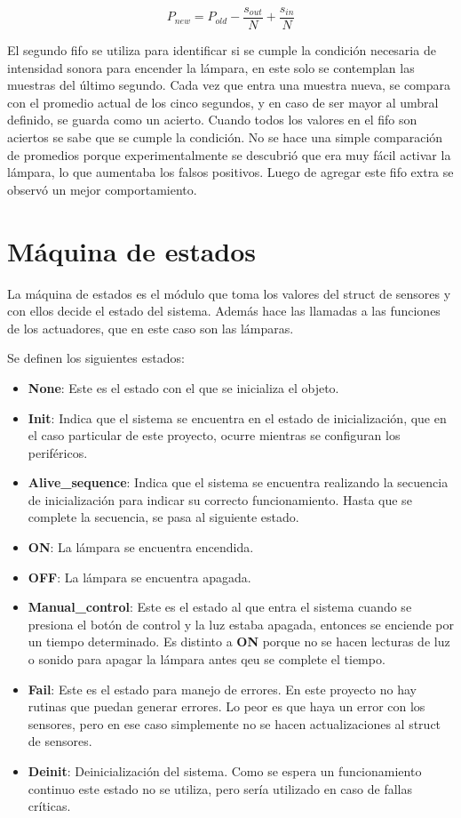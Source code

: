 \begin{equation}
  P_{new} = P_{old}-\frac{s_{out}}{N}+\frac{s_{in}}{N}
\end{equation}

El segundo fifo se utiliza para identificar si se cumple la condición necesaria de intensidad sonora
para encender la lámpara, en este solo se contemplan las muestras del último segundo.  Cada vez que
entra una muestra nueva, se compara con el promedio actual de los cinco segundos, y en caso de ser
mayor al umbral definido, se guarda como un acierto. Cuando todos los valores en el fifo son
aciertos se sabe que se cumple la condición. No se hace una simple comparación de promedios porque
experimentalmente se descubrió que era muy fácil activar la lámpara, lo que aumentaba los falsos
positivos. Luego de agregar este fifo extra se observó un mejor comportamiento.

\section{Máquina de estados}

La máquina de estados es el módulo que toma los valores del struct de sensores y con ellos decide el
estado del sistema. Además hace las llamadas a las funciones de los actuadores, que en este caso son
las lámparas. 

Se definen los siguientes estados:

\begin{itemize}
\item \textbf{None}: Este es el estado con el que se inicializa el objeto. 
\item \textbf{Init}: Indica que el sistema se encuentra en el estado de inicialización, que en el
  caso particular de este proyecto, ocurre mientras se configuran los periféricos.
\item \textbf{Alive\_sequence}: Indica que el sistema se encuentra realizando la secuencia de
  inicialización para indicar su correcto funcionamiento. Hasta que se complete la secuencia, se
  pasa al siguiente estado. 
\item \textbf{ON}: La lámpara se encuentra encendida.
\item \textbf{OFF}: La lámpara se encuentra apagada.
\item \textbf{Manual\_control}: Este es el estado al que entra el sistema cuando se presiona el
  botón de control y la luz estaba apagada, entonces se enciende por un tiempo determinado. Es
  distinto a \textbf{ON} porque no se hacen lecturas de luz o sonido para apagar la lámpara antes
  qeu se complete el tiempo.
\item \textbf{Fail}: Este es el estado para manejo de errores. En este proyecto no hay rutinas que
  puedan generar errores. Lo peor es que haya un error con los sensores, pero en ese caso simplemente
  no se hacen actualizaciones al struct de sensores. 
\item \textbf{Deinit}: Deinicialización del sistema. Como se espera un funcionamiento continuo este
  estado no se utiliza, pero sería utilizado en caso de fallas críticas. 
\end{itemize}

